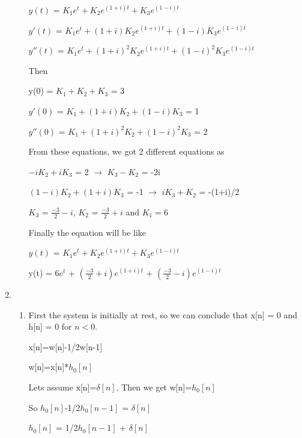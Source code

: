 \documentclass[10pt,a4paper, margin=1in]{article}
\begin{document}
\begin{enumerate}
\begin{enumerate}
    $y(t)$ = $K_1e^{t} + K_2e^{(1+i)t} + K_3e^{(1-i)t}$
    
    $y'(t)$ = $K_1e^{t} + (1+i)K_2e^{(1+i)t} + (1-i)K_3e^{(1-i)t}$
    
    $y''(t)$ = $K_1e^{t} + (1+i)^2K_2e^{(1+i)t} + (1-i)^2K_3e^{(1-i)t}$
    \vspace{0.25cm}
    
    Then
    
    y(0) = $K_1+K_2+K_3$ = 3
    
    $y'(0)$ = $K_1+(1+i)K_2+(1-i)K_3$ = 1
    
    $y''(0)$ = $K_1+(1+i)^2K_2+(1-i)^2K_3$ = 2
    
    From these equations, we got 2 different equations as
    
    $-iK_2+iK_3$ = 2 $\rightarrow$  $K_3-K_2$ = -2i
    
    $(1-i)K_2+(1+i)K_3 $ = -1 $\rightarrow$ $iK_3+K_2$ = -(1+i)/2
    
    $K_3$ = $\frac{-3}{2}-i$, $K_2$ = $\frac{-3}{2}+i$ and $K_1=6$
    \vspace{0.25cm}
    
    Finally the equation will be like
    
    $y(t)$ = $K_1e^{t} + K_2e^{(1+i)t} + K_3e^{(1-i)t}$
    
    y(t) = $6 e^t$ + $(\frac{-3}{2}+i) e^{(1+i)t}$ + $(\frac{-3}{2}-i) e^{(1-i)t}$
    
    
    
    
    
    
    
    \end{enumerate}


\item %
    \begin{enumerate}
    \item %
    
    First the system is initially at rest, so we can conclude that x[n] = 0 and h[n] = 0 for $n<0$.
    
    x[n]=w[n]-1/2w[n-1]
    
    w[n]=x[n]*$h_0[n]$
    \vspace{0.25cm}
    
    Lets assume x[n]=$\delta[n]$. Then we get w[n]=$h_0[n]$
    
    So $h_0[n]$-1/2$h_0[n-1]$ = $\delta[n]$
    
    $h_0[n]$ = 1/2$h_0[n-1]$ + $\delta[n]$
    

\end{enumerate}
\end{enumerate}
\end{document}
